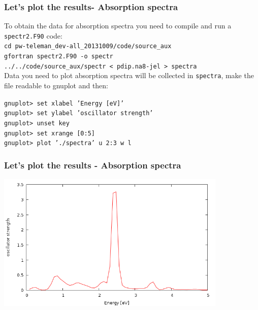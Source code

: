 \documentclass[10pt]{beamer}
\begin{document}
\begin{frame}
\frametitle{Let's plot the results- Absorption spectra}
To obtain the data for absorption spectra you need to compile and run a {\tt spectr2.F90} code:\\
\vspace*{0.2cm}
{\tt cd pw-teleman\_dev-all\_20131009/code/source\_aux}\\
\vspace*{0.1cm}
{\tt gfortran spectr2.F90 -o spectr}\\
\vspace*{0.1cm}
{\tt ../../code/source\_aux/spectr < pdip.na8-jel > spectra}\\
\vspace*{0.2cm}
Data you need to plot absorption spectra will be collected in {\tt spectra}, make the file readable to gnuplot and then:\\
\vspace*{0.2cm}

{\tt gnuplot> set xlabel 'Energy [eV]'\\
gnuplot> set ylabel 'oscillator strength'\\
gnuplot> unset key \\
gnuplot>  set xrange [0:5]\\
gnuplot>  plot './spectra' u 2:3 w l
}\\
  
\end{frame}




\begin{frame}
\frametitle{Let's plot the results - Absorption spectra}

\centering
 \includegraphics[width=11cm]{fig/spectr}



   
\end{frame}
\end{document}
